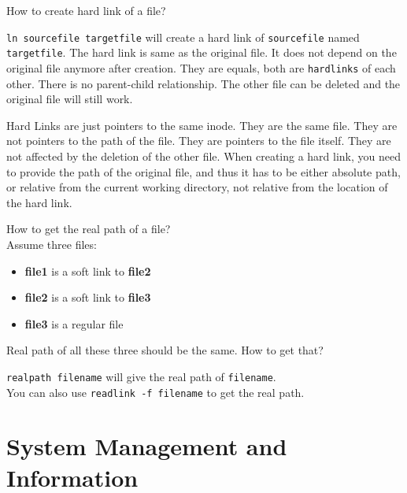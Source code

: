 \begin{qs}
  How to create hard link of a file?
\end{qs}

\begin{ans}
  \texttt{ln sourcefile targetfile} will create a hard link of \texttt{sourcefile}
  named \texttt{targetfile}. The hard link is same as the original file. It does
  not depend on the original file anymore after creation. They are equals,
  both are \texttt{hardlinks} of each other. There is no parent-child relationship.
  The other file can be deleted and the original file will still work.
\end{ans}

\begin{definition}
  Hard Links are just pointers to the same inode. They are the same file.
  They are not pointers to the path of the file. They are pointers to the
  file itself. They are not affected by the deletion of the other file.
  When creating a hard link, you need to provide the path of the original
  file, and thus it has to be either absolute path, or relative from the
  current working directory, not relative from the location of the hard link.
\end{definition}

\begin{qs}
  How to get the real path of a file?\\
  Assume three files:
  \begin{itemize}
    \item \textbf{file1} is a soft link to \textbf{file2}
    \item \textbf{file2} is a soft link to \textbf{file3}
    \item \textbf{file3} is a regular file
  \end{itemize}
  Real path of all these three should be the same. How to get that?
\end{qs}

\begin{ans}
  \texttt{realpath filename} will give the real path of \texttt{filename}. \\
  You can also use \texttt{readlink -f filename} to get the real path.
\end{ans}

\section{System Management and Information}

